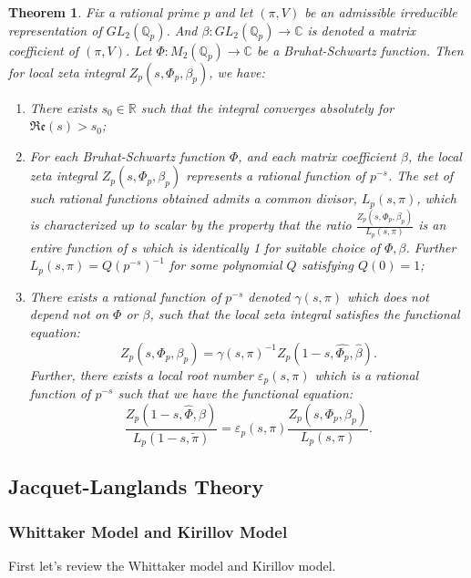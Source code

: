 \documentclass[12pt,a4paper,english]{article}
\theoremstyle{plain}
\newtheorem{thm}{Theorem}[section]
\theoremstyle{definition}
\begin{document}
 \begin{thm}
 Fix a rational prime $p$ and let $(\pi, V)$ be an admissible irreducible representation of $GL_{2}(\mathbb{Q}_{p})$. And $\beta: GL_{2}(\mathbb{Q}_{p})\rightarrow\mathbb{C}$ is denoted a matrix coefficient of $(\pi, V)$. Let $\Phi:M_{2}(\mathbb{Q}_{p})\rightarrow\mathbb{C}$ be a Bruhat-Schwartz function. Then for local zeta integral $Z_{p}(s,\Phi_{p},\beta_{p})$, we have:
 \begin{enumerate}
     \item There exists $s_{0}\in \mathbb{R}$ such that the integral converges absolutely for $\mathfrak{Re}(s)>s_{0}$;
     \item For each Bruhat-Schwartz function $\Phi$, and each matrix coefficient $\beta$, the local zeta integral $Z_{p}(s,\Phi_{p},\beta_{p})$ represents a rational function of $p^{-s}$. The set of such rational functions obtained admits a common divisor, $L_{p}(s, \pi)$, which is characterized up to scalar by the property that the ratio $\frac{Z_{p}(s,\Phi_{p},\beta_{p})}{L_{p}(s,\pi)}$ is an entire function of $s$ which is identically 1 for suitable choice of $\Phi, \beta$. Further $L_{p}(s,\pi)=Q(p^{-s})^{-1}$ for some polynomial $Q$ satisfying $Q(0)=1$;
     \item There exists a rational function of $p^{-s}$ denoted $\gamma(s,\pi)$ which does not depend not on $\Phi$ or $\beta$, such that the local zeta integral satisfies the functional equation:
     \begin{equation*}
         Z_{p}(s,\Phi_{p},\beta_{p})=\gamma(s,\pi)^{-1}Z_{p}(1-s,\hat{\Phi_{p}}, \hat{\beta}).
     \end{equation*}
     Further, there exists a local root number $\varepsilon_{p}(s,\pi)$ which is a rational function of $p^{-s}$ such that we have the functional equation:
     \begin{equation*}
         \frac{Z_{p}(1-s,\hat{\Phi},\hat{\beta})}{L_{p}(1-s,\tilde{\pi})}=\varepsilon_{p}(s,\pi)\frac{Z_{p}(s,\Phi_{p},\beta_{p})}{L_{p}(s,\pi)}.
     \end{equation*}
 \end{enumerate}
 \end{thm}
\subsection{Jacquet-Langlands Theory}
\subsubsection{Whittaker Model and Kirillov Model}
First let's review the Whittaker model and Kirillov model. 
\end{document}
